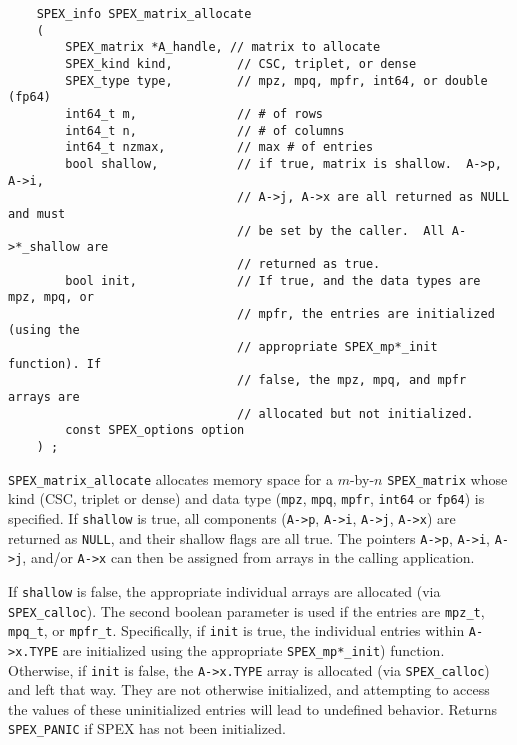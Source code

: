 \documentclass[12pt]{report}
\theoremstyle{definition}
\begin{document}
\begin{mdframed}[userdefinedwidth=6in]
{\footnotesize
\begin{verbatim}
    SPEX_info SPEX_matrix_allocate
    (
        SPEX_matrix *A_handle, // matrix to allocate
        SPEX_kind kind,         // CSC, triplet, or dense
        SPEX_type type,         // mpz, mpq, mpfr, int64, or double (fp64)
        int64_t m,              // # of rows
        int64_t n,              // # of columns
        int64_t nzmax,          // max # of entries
        bool shallow,           // if true, matrix is shallow.  A->p, A->i,
                                // A->j, A->x are all returned as NULL and must
                                // be set by the caller.  All A->*_shallow are
                                // returned as true.
        bool init,              // If true, and the data types are mpz, mpq, or
                                // mpfr, the entries are initialized (using the
                                // appropriate SPEX_mp*_init function). If
                                // false, the mpz, mpq, and mpfr arrays are
                                // allocated but not initialized.
        const SPEX_options option
    ) ;
\end{verbatim}
} \end{mdframed}

\verb|SPEX_matrix_allocate| allocates memory space for a $m$-by-$n$
\verb|SPEX_matrix| whose kind (CSC, triplet or dense) and data type
(\verb|mpz|, \verb|mpq|, \verb|mpfr|, \verb|int64| or \verb|fp64|) is
specified. If \verb|shallow| is true, all components (\verb|A->p|, \verb|A->i|,
\verb|A->j|, \verb|A->x|) are returned as \verb|NULL|, and their shallow flags
are all true.  The pointers \verb|A->p|, \verb|A->i|, \verb|A->j|,
and/or \verb|A->x| can then be assigned from arrays in the calling application.

If \verb|shallow| is false, the appropriate individual arrays are allocated
(via \verb|SPEX_calloc|). The second boolean parameter is used if the entries
are \verb|mpz_t|, \verb|mpq_t|, or \verb|mpfr_t|. Specifically, if \verb|init|
is true, the individual entries within \verb|A->x.TYPE| are initialized using
the appropriate \verb|SPEX_mp*_init|) function. Otherwise, if \verb|init| is
false, the \verb|A->x.TYPE| array is allocated (via \verb|SPEX_calloc|) and
left that way.  They are not otherwise initialized, and attempting to access
the values of these uninitialized entries will lead to undefined behavior.
Returns \verb|SPEX_PANIC| if SPEX has not been initialized.
\end{document}
